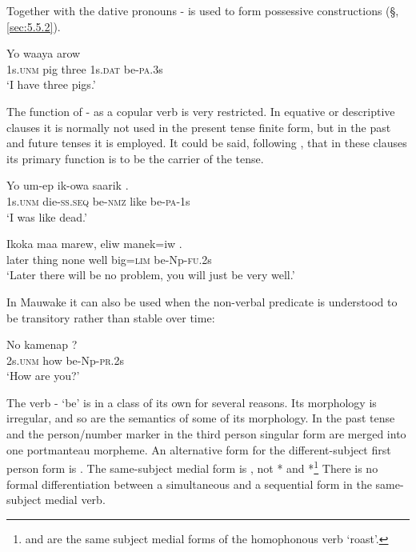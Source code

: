 Together with the dative pronouns - is used to form possessive constructions  (§, \ref{sec:5.5.2}). 

\ea%
\label{ex:3:x258}
\gll Yo waaya arow   \\
1s.\textsc{unm} pig three 1s.\textsc{dat} be-\textsc{pa}.3s \\
\glt`I have three pigs.'
\z

The function of - as a copular verb is very restricted. In equative or descriptive clauses it is normally not used in the present tense finite form, but in the past  and future  tenses it is employed. It could be said, following \citet[92]{Givon1984}, that in these clauses its primary function is to be the carrier of the tense. 

\ea%
\label{ex:3:x259}
\gll Yo um-ep ik-owa saarik . \\
1s.\textsc{unm} die-\textsc{ss}.\textsc{seq} be-\textsc{nmz} like be-\textsc{pa}-1s\\
\glt`I was like dead.'
\z

\ea%
\label{ex:3:x1070}
\gll Ikoka maa marew, eliw manek=iw . \\
later thing none well big=\textsc{lim} be-Np-\textsc{fu}.2s\\
\glt`Later there will be no problem, you will just be very well.'
\z

In Mauwake it can also be used when the non-verbal predicate is understood to be transitory  rather than stable over time:

\ea%
\label{ex:3:x499}
\gll No kamenap ? \\
2s.\textsc{unm} how be-Np-\textsc{pr}.2s\\
\glt`How are you?' 
\z

The verb - `be' is in a class of its own for several reasons. Its morphology is irregular, and so are the semantics of some of its morphology. In  the past tense and the person/number marker in the third person singular form are merged into one portmanteau morpheme. An alternative form for the different-subject first person form  is  . The same-subject medial form is  , not * and *\footnote{ and  are the same subject medial forms of the homophonous verb  `roast'.} There is no formal differentiation between a simultaneous  and a sequential  form in the same-subject medial verb. 

